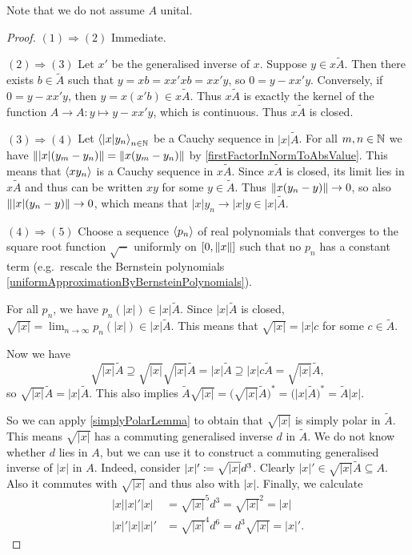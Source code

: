 Note that we do not assume $A$ unital.
\begin{proof}
$(1) \Rightarrow (2)$ Immediate.

$(2) \Rightarrow (3)$ Let $x'$ be the generalised inverse of $x$. Suppose $y \in x\widetilde{A}$. Then there exists $b\in \widetilde{A}$ such that $y = xb = xx'xb = xx'y$, so $0 = y- xx'y$. Conversely, if $0 = y- xx'y$, then $y = x(x'b) \in x\widetilde{A}$. Thus $x\widetilde{A}$ is exactly the kernel of the function $A\to A: y\mapsto y - xx'y$, which is continuous. Thus $x\widetilde{A}$ is closed.

$(3) \Rightarrow (4)$ Let $\left\langle |x|y_n \right\rangle_{n\in \mathbb{N}}$ be a Cauchy sequence in $|x|\widetilde{A}$. For all $m,n\in \mathbb{N}$ we have $\lVert|x|(y_m - y_n)\rVert = \lVert x(y_m - y_n)\rVert$ by \ref{firstFactorInNormToAbsValue}. This means that $\left\langle xy_n \right\rangle$ is a Cauchy sequence in $x\widetilde{A}$. Since $x\widetilde{A}$ is closed, its limit lies in $x\widetilde{A}$ and thus can be written $xy$ for some $y\in \widetilde{A}$. Thus $\lVert x(y_n - y)\rVert \to 0$, so also $\lVert|x|(y_n - y)\rVert \to 0$, which means that $|x|y_n \to |x|y \in |x|\widetilde{A}$.

$(4) \Rightarrow (5)$ Choose a sequence $\left\langle p_n \right\rangle$ of real polynomials that converges to the square root function $\sqrt{-}$ uniformly on $\interval{0,\norm{x}}$ such that no $p_n$ has a constant term (e.g.\ rescale the Bernstein polynomials \ref{uniformApproximationByBernsteinPolynomials}).

For all $p_n$, we have $p_n(|x|) \in |x|\widetilde{A}$. Since $|x|\widetilde{A}$ is closed, $\sqrt{|x|} = \lim_{n\to \infty} p_n(|x|) \in |x|\widetilde{A}$. This means that $\sqrt{|x|} = |x|c$ for some $c\in \widetilde A$.

Now we have
\[ \sqrt{|x|}\widetilde{A} \supseteq \sqrt{|x|}\sqrt{|x|}\widetilde{A} = |x|\widetilde{A} \supseteq |x|c\widetilde{A} = \sqrt{|x|}\widetilde{A}, \]
so $\sqrt{|x|}\widetilde{A} = |x|\widetilde{A}$. This also implies $\widetilde{A}\sqrt{|x|} = \big(\sqrt{|x|}\widetilde{A}\big)^* = \big(|x|\widetilde{A}\big)^* = \widetilde{A}|x|$.

So we can apply \ref{simplyPolarLemma} to obtain that $\sqrt{|x|}$ is simply polar in $\widetilde{A}$. This means $\sqrt{|x|}$ has a commuting generalised inverse $d$ in $\widetilde{A}$. We do not know whether $d$ lies in $A$, but we can use it to construct a commuting generalised inverse of $|x|$ in $A$. Indeed, consider $|x|'\coloneqq \sqrt{|x|}d^3$. Clearly $|x|' \in \sqrt{|x|}\widetilde{A} \subseteq A$. Also it commutes with $\sqrt{|x|}$ and thus also with $|x|$. Finally, we calculate
\begin{align*}
|x||x|'|x| &= \sqrt{|x|}^5d^3 = \sqrt{|x|}^2 = |x| \\
|x|'|x||x|' &= \sqrt{|x|}^4d^6 = d^3\sqrt{|x|} = |x|'.
\end{align*}


\end{proof}
